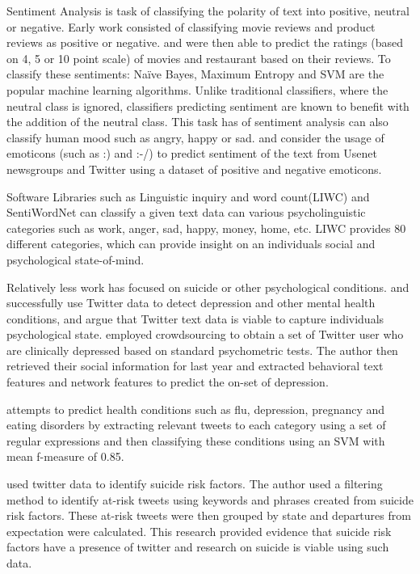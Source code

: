 Sentiment Analysis is task of classifying the polarity of text into positive, neutral or negative. Early work consisted of  classifying movie reviews \citep{Pang} and product reviews \citep{Turney}  as positive or negative. \cite{Pang} and \cite{Snyder07multipleaspect} were then able to predict the ratings (based on 4, 5 or 10 point scale) of movies and restaurant based on their reviews. To classify these sentiments: Na\"ive Bayes, Maximum Entropy and SVM are the popular machine learning algorithms. Unlike traditional classifiers, where the neutral class is ignored, classifiers predicting sentiment are known to benefit with the addition of the neutral class. This task has of sentiment analysis can also classify human mood such as angry, happy or sad. \cite{read2005using} and \cite{Go} consider the usage of emoticons (such as :) and :-/) to predict sentiment of the text from Usenet newsgroups and Twitter using a dataset of positive and negative emoticons.

Software Libraries such as Linguistic inquiry and word count(LIWC)\citep{pennebaker2001linguistic} and SentiWordNet \citep{Baccianella} can classify a  given text data can various psycholinguistic categories such as work, anger, sad, happy, money, home, etc. LIWC provides 80 different categories, which can provide insight on an individuals social and psychological state-of-mind. 

Relatively less work has focused on suicide or other psychological conditions. \cite{ChoudhuryGCH13} and \cite{ponePrieto} successfully use Twitter data to detect depression and other mental health conditions, and argue that Twitter text data is viable to capture individuals psychological state. \cite{ChoudhuryGCH13} employed crowdsourcing to obtain a set of Twitter user who are clinically depressed based on standard psychometric tests. The author then retrieved  their social  information for last year and extracted behavioral text features and network features to predict the on-set of depression.

\cite{ponePrieto} attempts to predict health conditions such as flu, depression, pregnancy and eating disorders by extracting relevant tweets to each category using a set of regular expressions and then classifying these conditions using an SVM with mean f-measure of 0.85. 

\cite{Jay} used twitter data to identify suicide risk factors. The author used a filtering method to identify at-risk tweets using keywords and
phrases created from suicide risk factors. These at-risk tweets were then grouped by state and departures from expectation were calculated. This research provided evidence that suicide risk factors have a presence of twitter and research on suicide is viable using such data. 

